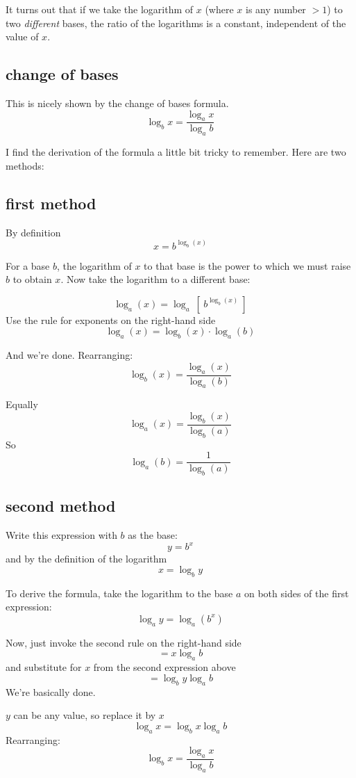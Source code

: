 \documentclass[11pt, oneside]{article}
\begin{document}
It turns out that if we take the logarithm of $x$ (where $x$ is any number $> 1$) to two \emph{different} bases, the ratio of the logarithms is a constant, independent of the value of $x$.  

\subsection*{change of bases}

This is nicely shown by the change of bases formula.
\[ \log_b x = \frac{\log_a x}{\log_a b} \]

I find the derivation of the formula a little bit tricky to remember.  Here are two methods:

\subsection*{first method}

By definition 
\[ x = b^{\log_b(x)} \]

For a base $b$, the logarithm of $x$ to that base is the power to which we must raise $b$ to obtain $x$.  Now take the logarithm to a different base:

\[ \log_a(x) = \log_a \ [ \  b^{\log_b(x)} \ ]  \]
Use the rule for exponents on the right-hand side
\[ \log_a(x) = \log_b(x) \cdot \log_a(b)  \]

And we're done.  Rearranging:
\[ \log_b(x) = \frac{\log_a(x)}{\log_a(b)} \]

Equally
\[ \log_a(x) = \frac{\log_b(x)}{\log_b(a)} \]
So
\[ \log_a(b) = \frac{1}{\log_b(a)} \]

\subsection*{second method}

Write this expression with $b$ as the base:
\[ y = b^x \]
and by the definition of the logarithm
\[ x = \log_b y \]

To derive the formula, take the logarithm to the base $a$ on both sides of the first expression:
\[ \log_a y = \log_a (b^x) \]

Now, just invoke the second rule on the right-hand side
\[ = x \log_a b \]
and substitute for $x$ from the second expression above
\[ = \log_b y \log_a b \]
We're basically done.

$y$ can be any value, so replace it by $x$
\[ \log_a x = \log_b x \log_a b \]
Rearranging:
\[ \log_b x = \frac{\log_a x}{\log_a b} \]
\end{document}
